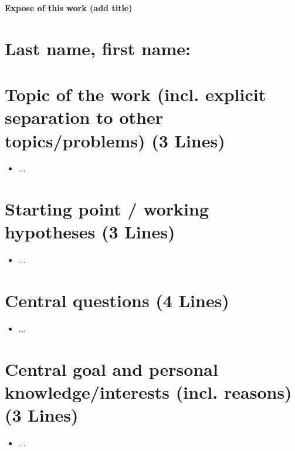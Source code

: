 \documentclass[12pt]{scrartcl}
\begin{document}
\begin{center}
\textbf{\fontsize{16}{16}\selectfont Expose of this work (add title)}
\end{center}

\bigskip

\section*{Last name, first name:  }



\section*{Topic of the work (incl. explicit separation to other topics/problems) (3 Lines)}


\begin{itemize}
    \item ...
 
\end{itemize}


\section*{Starting point / working hypotheses (3 Lines)}

\begin{itemize}
    \item ...
 
\end{itemize}

\section*{Central questions (4 Lines)}

\begin{itemize}
    \item ...
 
\end{itemize}

\section*{Central goal and personal knowledge/interests (incl. reasons) (3 Lines)}

\begin{itemize}
    \item ...
 
\end{itemize}
\end{document}
